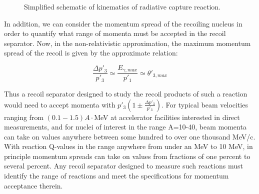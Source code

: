 \begin{figure}
\caption{Simplified schematic of kinematics of radiative capture reaction.}
\label{fig:kinematics}       %
\end{figure}

In addition, we can consider the momentum spread of the recoiling nucleus in order to quantify what range of momenta must be accepted in the recoil separator. Now, in the non-relativistic approximation, the maximum momentum spread of the recoil is given by the approximate relation:

\begin{equation}
\frac{\Delta p'_{3}}{p'_{3}}\simeq\frac{E_{\gamma,max}}{p'_{1}}\simeq\theta'_{3,max}
\end{equation} 

Thus a recoil separator designed to study the recoil products of such a reaction would need to accept momenta with $p'_{3}(1\pm\frac{\Delta p'_{3}}{p'_{3}})$. For typical beam velocities ranging from $(0.1-1.5)A\cdot$MeV at accelerator facilities interested in direct measurements, and for nuclei of interest in the range A=10-40, beam momenta can take on values anywhere between some hundred to over one thousand MeV/c. With reaction Q-values in the range anywhere from under an MeV to 10 MeV, in principle momentum spreads can take on values from fractions of one percent to several percent. Any recoil separator designed to measure such reactions must identify the range of reactions and meet the specifications for momentum acceptance therein.  

